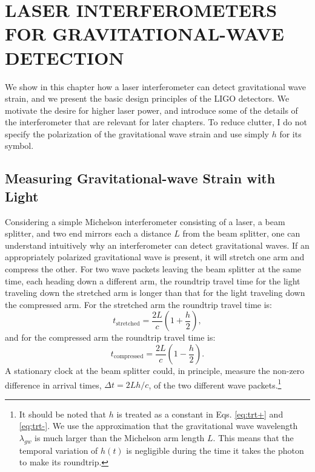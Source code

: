 \chapter{LASER INTERFEROMETERS FOR GRAVITATIONAL-WAVE DETECTION}

We show in this chapter how a laser interferometer can detect
gravitational wave strain, and we present the basic design principles
of the LIGO detectors. We motivate the desire for higher laser power,
and introduce some of the details of the interferometer that are
relevant for later chapters. To reduce clutter, I do not specify the
polarization of the gravitational wave strain and use simply $h$ for
its symbol.


\section{Measuring Gravitational-wave Strain with Light}
Considering a simple Michelson interferometer consisting of a laser, a
beam splitter, and two end mirrors each a distance $L$ from the beam
splitter, one can understand intuitively why an interferometer can
detect gravitational waves. If an appropriately polarized
gravitational wave is present, it will stretch one arm and compress
the other. For two wave packets leaving the beam splitter at the same
time, each heading down a different arm, the roundtrip travel time for
the light traveling down the stretched arm is longer than that for the
light traveling down the compressed arm. For the stretched arm the
roundtrip travel time is:
\begin{equation}
t_{\mathrm{stretched}} = \frac{2 L}{c} \left( 1 + \frac{h}{2} \right),
\label{eq:trt+} 
\end{equation}
and for the compressed arm the roundtrip travel time is:
\begin{equation}
t_{\mathrm{compressed}} = \frac{2 L}{c} \left( 1 - \frac{h}{2} \right).
\label{eq:trt-} 
\end{equation}
A stationary clock at the beam splitter could, in principle, measure
the non-zero difference in arrival times, $\Delta t = 2Lh/c$, of the
two different wave packets.\footnote{It should be noted that $h$ is
  treated as a constant in Eqs. \ref{eq:trt+} and \ref{eq:trt-}. We
  use the approximation that the gravitational wave wavelength
  $\lambda_{gw}$ is much larger than the Michelson arm length
  $L$. This means that the temporal variation of $h(t)$ is negligible
  during the time it takes the photon to make its roundtrip.}

